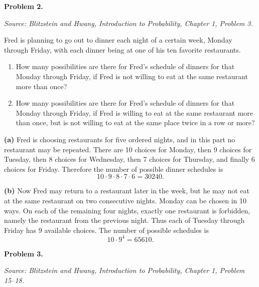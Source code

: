 \documentclass[11pt]{article}
\newcommand{\source}[1]{%
    \vspace{0.15cm}
    {\small\textit{Source: Blitzstein and Hwang, \textit{Introduction to Probability}, Chapter 1, Problem #1.}}
}
\begin{document}

\begin{problemheader}
\textbf{Problem 2.} \hfill  
\end{problemheader}
\source{3}

Fred is planning to go out to dinner each night of a certain week, Monday through Friday, with each dinner being at one of his ten favorite restaurants.

\begin{enumerate}[label=(\alph*), leftmargin=*]
    \item How many possibilities are there for Fred's schedule of dinners for that Monday through Friday, if Fred is not willing to eat at the same restaurant more than once?

    \item How many possibilities are there for Fred's schedule of dinners for that Monday through Friday, if Fred is willing to eat at the same restaurant more than once, but is not willing to eat at the same place twice in a row or more?
\end{enumerate}

\begin{solutionbox}
\textbf{(a)} Fred is choosing restaurants for five ordered nights, and in this part no restaurant may be repeated. There are 10 choices for Monday, then 9 choices for Tuesday, then 8 choices for Wednesday, then 7 choices for Thursday, and finally 6 choices for Friday. Therefore the number of possible dinner schedules is
\[
10\cdot 9\cdot 8\cdot 7\cdot 6
=
30240.
\]



\textbf{(b)} Now Fred may return to a restaurant later in the week, but he may not eat at the same restaurant on two consecutive nights. Monday can be chosen in 10 ways. On each of the remaining four nights, exactly one restaurant is forbidden, namely the restaurant from the previous night. Thus each of Tuesday through Friday has 9 available choices. The number of possible schedules is
\[
10\cdot 9^4
=
65610.
\]


\end{solutionbox}
\newpage


\begin{problemheader}
\textbf{Problem 3.} \hfill  
\end{problemheader}
\source{15--18}
\end{document}

